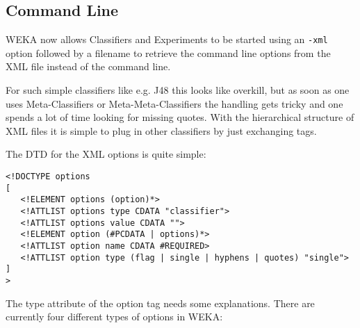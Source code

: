 \subsection{Command Line}
\label{xml_command_line}
WEKA now allows Classifiers and Experiments to be started using an
\verb=-xml= option followed by a filename to retrieve the command line
options from the XML file instead of the command line.

For such simple classifiers like e.g. J48 this looks like overkill,
but as soon as one uses Meta-Classifiers or Meta-Meta-Classifiers the
handling gets tricky and one spends a lot of time looking for missing
quotes. With the hierarchical structure of XML files it is simple to
plug in other classifiers by just exchanging tags.

The DTD for the XML options is quite simple:

\begin{verbatim}
<!DOCTYPE options
[
   <!ELEMENT options (option)*>
   <!ATTLIST options type CDATA "classifier">
   <!ATTLIST options value CDATA "">
   <!ELEMENT option (#PCDATA | options)*>
   <!ATTLIST option name CDATA #REQUIRED>
   <!ATTLIST option type (flag | single | hyphens | quotes) "single">
]
>
\end{verbatim}

\noindent The type attribute of the option tag needs some
explanations. There are currently four different types of options in
WEKA:


